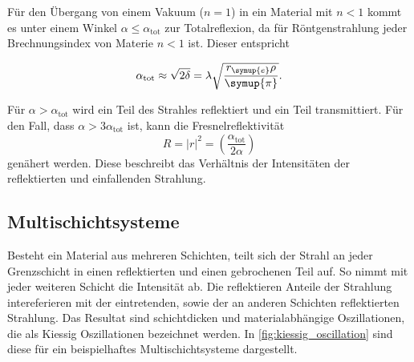 Für den Übergang von einem Vakuum ($n=1$) in ein Material mit $n<1$ kommt es unter einem Winkel $\alpha \leq \alpha_{\text{tot}}$ zur Totalreflexion, da
für Röntgenstrahlung jeder Brechnungsindex 
von Materie $n<1$ ist. Dieser entspricht

\begin{equation}
    \alpha_{\text{tot}} \approx \sqrt{2\delta} = \lambda \sqrt{\frac{r_{\symup{e}}\rho}{\symup{\pi}}}.
    \label{eq:alpha_tot}
\end{equation}

Für $\alpha > \alpha_\text{tot}$ wird ein Teil des Strahles reflektiert und ein Teil transmittiert. Für den Fall, dass $\alpha > 3 \alpha_{\text{tot}}$ ist, kann
die Fresnelreflektivität
\begin{equation}
    R = |{r}|^2 = \left(\frac{\alpha_{\text{tot}}}{2\alpha}\right)
    \label{eq:Reflektivitaet}
\end{equation}
genähert werden. Diese beschreibt das Verhältnis der Intensitäten der reflektierten und einfallenden Strahlung.%

\subsection{Multischichtsysteme}
Besteht ein Material aus mehreren Schichten, teilt sich der Strahl an jeder Grenzschicht in einen reflektierten und einen gebrochenen Teil auf. So nimmt mit jeder weiteren Schicht
die Intensität ab. Die reflektieren Anteile der Strahlung intereferieren mit der eintretenden, sowie der an anderen Schichten reflektierten Strahlung. Das Resultat sind schichtdicken
und materialabhängige Oszillationen, die als Kiessig Oszillationen bezeichnet werden. In \autoref{fig:kiessig_oscillation} sind diese für ein beispielhaftes Multischichtsysteme dargestellt.

